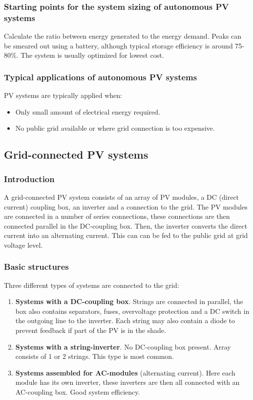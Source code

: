 \documentclass[a4paper,10pt]{article}
\begin{document}
\subsubsection{Starting points for the system sizing of autonomous PV systems}
Calculate the ratio between energy generated to the energy demand. Peaks can be smeared out using a battery, although typical storage efficiency is around 75-80\%. The system is usually optimized for lowest cost. 

\subsubsection{Typical applications of autonomous PV systems}
PV systems are typically applied when:
\begin{itemize}
 \item Only small amount of electrical energy required.
 \item No public grid available or where grid connection is too expensive.
\end{itemize}

\subsection{Grid-connected PV systems}
\subsubsection{Introduction}
A grid-connected PV system consists of an array of PV modules, a DC (direct current) coupling box, an inverter and a connection to the grid. The PV modules are connected in a number of series connections, these connections are then connected parallel in the DC-coupling box. Then, the inverter converts the direct current into an alternating current. This can can be fed to the public grid at grid voltage level. 

\subsubsection{Basic structures}
Three different types of systems are connected to the grid:
\begin{enumerate}[label=\alph*.]
 \item \textbf{Systems with a DC-coupling box}. Strings are connected in parallel, the box also contains separators, fuses, overvoltage protection and a DC switch in the outgoing line to the inverter. Each string may also contain a diode to prevent feedback if part of the PV is in the shade.
 \item \textbf{Systems with a string-inverter}. No DC-coupling box present. Array consists of 1 or 2 strings. This type is most common.
 \item \textbf{Systems assembled for AC-modules} (alternating current). Here each module has its own inverter, these inverters are then all connected with an AC-coupling box. Good system efficiency. 
\end{enumerate}
\end{document}
